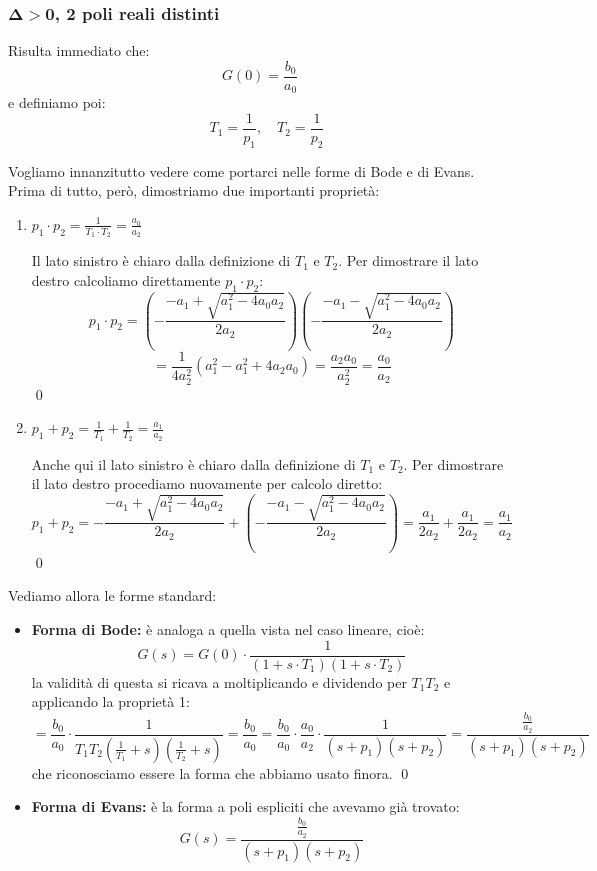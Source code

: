 \documentclass[a4paper,11pt]{article}
\begin{document}
\subsubsection{$\mathbf{\Delta > 0}$, 2 poli reali distinti}
Risulta immediato che:
$$G(0) = \frac{b_0}{a_0}$$
e definiamo poi:
$$
\quad T_1 = \frac{1}{p_1}, \quad T_2 = \frac{1}{p_2}
$$

Vogliamo innanzitutto vedere come portarci nelle forme di Bode e di Evans.
Prima di tutto, però, dimostriamo due importanti proprietà:
\begin{enumerate}
	\item $p_1 \cdot p_2 = \frac{1}{T_1 \cdot T_2} = \frac{a_0}{a_2}$ \par\smallskip 
		Il lato sinistro è chiaro dalla definizione di $T_1$ e $T_2$.
		Per dimostrare il lato destro calcoliamo direttamente $p_1 \cdot p_2$:
		$$
		p_1 \cdot p_2 = \left( - \frac{-a_1 + \sqrt{a_1^2 - 4 a_0 a_2}}{2 a_2} \right) \left( - \frac{-a_1 - \sqrt{a_1^2 - 4 a_0 a_2}}{2 a_2} \right)
		$$
		$$
		= \frac{1}{4a_2^2} \left( a_1^2 - a_1^2 + 4a_2a_0 \right) = \frac{a_2 a_0}{a_2^2} = \frac{a_0}{a_2}
		$$ \qed
		
	\item $p_1 + p_2 = \frac{1}{T_1} + \frac{1}{T_2} = \frac{a_1}{a_2}$ \par\smallskip
		Anche qui il lato sinistro è chiaro dalla definizione di $T_1$ e $T_2$.
		Per dimostrare il lato destro procediamo nuovamente per calcolo diretto:
		$$
		p_1 + p_2 = - \frac{-a_1 + \sqrt{a_1^2 - 4 a_0 a_2}}{2 a_2} + \left( - \frac{-a_1 - \sqrt{a_1^2 - 4 a_0 a_2}}{2 a_2} \right) = \frac{a_1}{2 a_2} + \frac{a_1}{2 a_2} = \frac{a_1}{a_2}
		$$ \qed
\end{enumerate}

Vediamo allora le forme standard:
\begin{itemize}
	\item \textbf{Forma di Bode:} è analoga a quella vista nel caso lineare, cioè:
	$$
	G(s) = G(0) \cdot \frac{1}{(1 + s \cdot T_1)(1 + s \cdot T_2)}
	$$
	la validità di questa si ricava a moltiplicando e dividendo per $T_1 T_2$ e applicando la proprietà 1:
	$$
	= \frac{b_0}{a_0} \cdot \frac{1}{T_1 T_2 (\frac{1}{T_1} + s)(\frac{1}{T_2} + s)} = \frac{b_0}{a_0} = \frac{b_0}{a_0} \cdot \frac{a_0}{a_2} \cdot \frac{1}{(s + p_1)(s + p_2)} = \frac{\frac{b_0}{a_2}}{(s + p_1)(s + p_2)}
	$$ 
	che riconosciamo essere la forma che abbiamo usato finora.
	\qed
	\item \textbf{Forma di Evans:} è la forma a poli espliciti che avevamo già trovato:
	$$
	G(s) = \frac{\frac{b_0}{a_2}}{(s + p_1)(s + p_2)}
	$$
\end{itemize}
\end{document}
